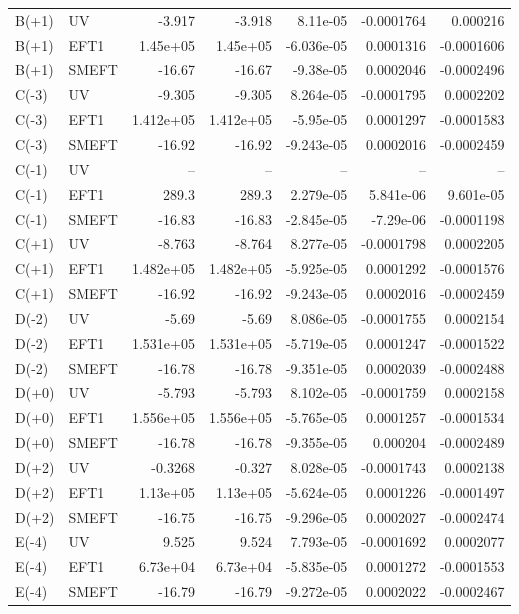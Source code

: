 \begin{table}[htbp]
\begin{tabular}{llrrrrr}
B(+1) & UV & -3.917 & -3.918 & 8.11e-05 & -0.0001764 & 0.000216 \\
B(+1) & EFT1 & 1.45e+05 & 1.45e+05 & -6.036e-05 & 0.0001316 & -0.0001606 \\
B(+1) & SMEFT & -16.67 & -16.67 & -9.38e-05 & 0.0002046 & -0.0002496 \\
C(-3) & UV & -9.305 & -9.305 & 8.264e-05 & -0.0001795 & 0.0002202 \\
C(-3) & EFT1 & 1.412e+05 & 1.412e+05 & -5.95e-05 & 0.0001297 & -0.0001583 \\
C(-3) & SMEFT & -16.92 & -16.92 & -9.243e-05 & 0.0002016 & -0.0002459 \\
C(-1) & UV & -- & -- & -- & -- & -- \\
C(-1) & EFT1 & 289.3 & 289.3 & 2.279e-05 & 5.841e-06 & 9.601e-05 \\
C(-1) & SMEFT & -16.83 & -16.83 & -2.845e-05 & -7.29e-06 & -0.0001198 \\
C(+1) & UV & -8.763 & -8.764 & 8.277e-05 & -0.0001798 & 0.0002205 \\
C(+1) & EFT1 & 1.482e+05 & 1.482e+05 & -5.925e-05 & 0.0001292 & -0.0001576 \\
C(+1) & SMEFT & -16.92 & -16.92 & -9.243e-05 & 0.0002016 & -0.0002459 \\
D(-2) & UV & -5.69 & -5.69 & 8.086e-05 & -0.0001755 & 0.0002154 \\
D(-2) & EFT1 & 1.531e+05 & 1.531e+05 & -5.719e-05 & 0.0001247 & -0.0001522 \\
D(-2) & SMEFT & -16.78 & -16.78 & -9.351e-05 & 0.0002039 & -0.0002488 \\
D(+0) & UV & -5.793 & -5.793 & 8.102e-05 & -0.0001759 & 0.0002158 \\
D(+0) & EFT1 & 1.556e+05 & 1.556e+05 & -5.765e-05 & 0.0001257 & -0.0001534 \\
D(+0) & SMEFT & -16.78 & -16.78 & -9.355e-05 & 0.000204 & -0.0002489 \\
D(+2) & UV & -0.3268 & -0.327 & 8.028e-05 & -0.0001743 & 0.0002138 \\
D(+2) & EFT1 & 1.13e+05 & 1.13e+05 & -5.624e-05 & 0.0001226 & -0.0001497 \\
D(+2) & SMEFT & -16.75 & -16.75 & -9.296e-05 & 0.0002027 & -0.0002474 \\
E(-4) & UV & 9.525 & 9.524 & 7.793e-05 & -0.0001692 & 0.0002077 \\
E(-4) & EFT1 & 6.73e+04 & 6.73e+04 & -5.835e-05 & 0.0001272 & -0.0001553 \\
E(-4) & SMEFT & -16.79 & -16.79 & -9.272e-05 & 0.0002022 & -0.0002467 \\

\end{tabular}
\end{table}
